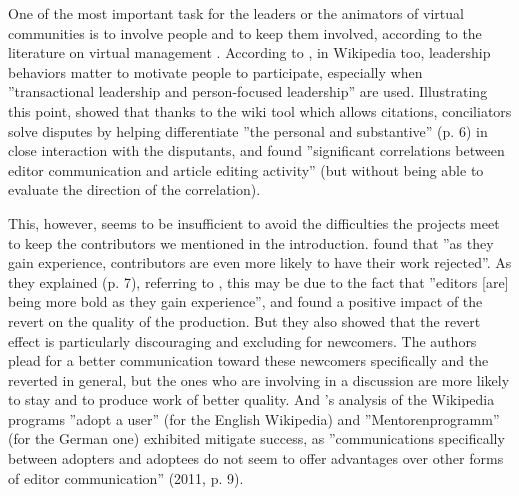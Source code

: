 One of the most important task for the leaders or the animators of
virtual communities is to involve people and to keep them involved,
according to the literature on virtual management \citep[see][p. 15]{CrowstonHeckmanMisiolek10}.
According to \citet{ZhuKrautKittur12}, in Wikipedia too, leadership
behaviors matter to motivate people to participate, especially when
''transactional leadership and person-focused leadership'' are used.
Illustrating this point, \citet{BillingsWatts10} showed that thanks
to the wiki tool which allows citations, conciliators solve disputes
by helping differentiate ''the personal and substantive'' (p. 6)
in close interaction with the disputants, and \citet{Musicantetal11}
found ''significant correlations between editor communication and
article editing activity'' (but without being able to evaluate the
direction of the correlation).

This, however, seems to be insufficient to avoid the difficulties
the projects meet to keep the contributors we mentioned in the introduction.
\citet{Halfakeretal09} found that ''as they gain experience, contributors
are even more likely to have their work rejected''. As they explained
(p. 7), referring to \citet{Bryantetal05}, this may be due to the
fact that ''editors {[}are{]} being more bold as they gain experience'',
and \citet{HalfakerKitturRiedl11} found a positive impact of the
revert on the quality of the production. But they also showed that
the revert effect is particularly discouraging and excluding for newcomers.
The authors plead for a better communication toward these newcomers
specifically and the reverted in general, but the ones who are involving
in a discussion are more likely to stay and to produce work of better
quality. And \citeauthor{Musicantetal11}'s analysis of the Wikipedia
programs ''adopt a user'' (for the English Wikipedia) and ''Mentorenprogramm''
(for the German one) exhibited mitigate success, as ''communications
specifically between adopters and adoptees do not seem to offer advantages
over other forms of editor communication'' (2011, p. 9).

